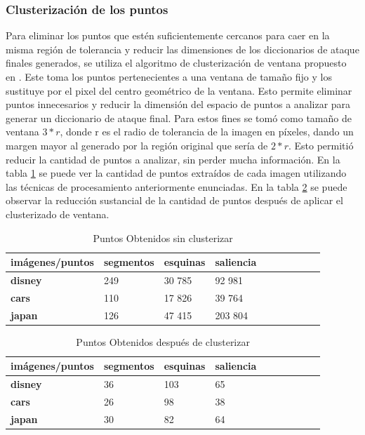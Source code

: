 \subsubsection{Clusterizaci\'on de los puntos }
Para eliminar los puntos que est\'en suficientemente cercanos para caer en la misma regi\'on de tolerancia y reducir las dimensiones de los diccionarios de ataque finales generados, se utiliza el algoritmo de clusterizaci\'on de ventana propuesto en \cite{van2010purely}. Este toma los puntos pertenecientes a una ventana de tama\~no fijo y los sustituye por el pixel del centro geom\'etrico de la ventana. Esto permite eliminar puntos innecesarios y reducir la dimensi\'on del espacio de puntos a analizar para generar un diccionario de ataque final. Para estos fines se tom\'o como tama\~no de ventana $3*r$, donde r es el radio de tolerancia de la imagen en p\'ixeles, dando un margen mayor al generado por la regi\'on original que ser\'ia de $2*r$. Esto permiti\'o reducir la cantidad de puntos a analizar, sin perder mucha informaci\'on. En la tabla \ref{points:void} se puede ver la cantidad de puntos extra\'idos de cada imagen utilizando las t\'ecnicas de procesamiento anteriormente enunciadas. En la tabla \ref{points:cluster} se puede observar la reducci\'on sustancial de la cantidad de puntos despu\'es de aplicar el clusterizado de ventana.
\begin{table}[H]
	\centering
	\caption{Puntos Obtenidos sin clusterizar}
	\label{points:void}
	\begin{tabular}{|l|l|l|l|l|l|l|l|l|l|}
		\hline
		\textbf{im\'agenes/puntos} & \textbf{segmentos } & \textbf{esquinas} & \textbf{saliencia}
		\\ \hline
		\textbf{disney} & 249 & 30 785 & 92 981 \\ \hline
		\textbf{cars} & 110 & 17 826 & 39 764 \\ \hline
		\textbf{japan} & 126 & 47 415 & 203 804  \\ \hline
	
	\end{tabular}
\end{table}

\begin{table}[H]
	\centering
	\caption{Puntos Obtenidos despu\'es de clusterizar}
		\label{points:cluster}
	\begin{tabular}{|l|l|l|l|l|l|l|l|l|l|}
		\hline
		\textbf{im\'agenes/puntos} & \textbf{segmentos} & \textbf{esquinas} & \textbf{saliencia }  \\ \hline
		\textbf{disney} & 36 & 103 & 65  \\ \hline
		\textbf{cars} & 26 & 98 & 38  \\ \hline
		\textbf{japan} & 30 & 82 & 64 \\ \hline
	\end{tabular}
\end{table}

